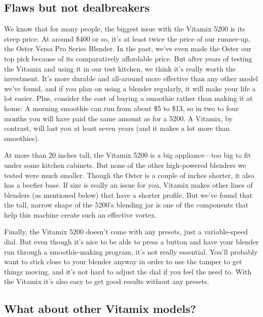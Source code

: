 \hypertarget{flaws-but-not-dealbreakers}{%
\subsection{Flaws but not
dealbreakers}\label{flaws-but-not-dealbreakers}}

We know that for many people, the biggest issue with the Vitamix 5200 is
its steep price. At around \$400 or so, it's at least twice the price of
our runner-up, the Oster Versa Pro Series Blender. In the past, we've
even made the Oster our top pick because of its comparatively affordable
price. But after years of testing the Vitamix and using it in our test
kitchen, we think it's really worth the investment. It's more durable
and all-around more effective than any other model we've found, and if
you plan on using a blender regularly, it will make your life a lot
easier. Plus, consider the cost of buying a smoothie rather than making
it at home: A morning smoothie can run from about \$5 to \$13, so in two
to four months you will have paid the same amount as for a 5200. A
Vitamix, by contrast, will last you at least seven years (and it makes a
lot more than smoothies).

At more than 20 inches tall, the Vitamix 5200 is a big appliance---too
big to fit under some kitchen cabinets. But none of the other
high-powered blenders we tested were much smaller. Though the Oster is a
couple of inches shorter, it also has a beefier base. If size is really
an issue for you, Vitamix makes other lines of blenders (as mentioned
below) that have a shorter profile. But we've found that the tall,
narrow shape of the 5200's blending jar is one of the components that
help this machine create such an effective vortex.

Finally, the Vitamix 5200 doesn't come with any presets, just a
variable-speed dial. But even though it's nice to be able to press a
button and have your blender run through a smoothie-making program, it's
not really essential. You'll probably want to stick close to your
blender anyway in order to use the tamper to get things moving, and it's
not hard to adjust the dial if you feel the need to. With the Vitamix
it's also easy to get good results without any presets.

\hypertarget{what-about-other-vitamix-models}{%
\subsection{What about other Vitamix
models?}\label{what-about-other-vitamix-models}}

